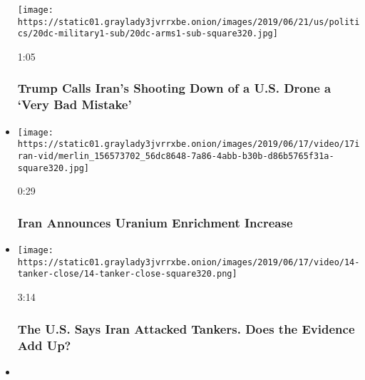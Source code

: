 \begin{itemize}
  \texttt{[image: https://static01.graylady3jvrrxbe.onion/images/2019/06/21/us/politics/20dc-military1-sub/20dc-arms1-sub-square320.jpg]}

  1:05

  \hypertarget{trump-calls-irans-shooting-down-of-a-us-drone-a-very-bad-mistake}{%
  \subsubsection{Trump Calls Iran's Shooting Down of a U.S. Drone a
  `Very Bad
  Mistake'}\label{trump-calls-irans-shooting-down-of-a-us-drone-a-very-bad-mistake}}
\item
  \href{https://www.nytimes3xbfgragh.onion/video/world/middleeast/100000006562480/iran-uranium.html?action=click\&module=video-series-bar\&region=header\&pgtype=Article\&playlistId=video/us-iran-relations}{}

  \texttt{[image: https://static01.graylady3jvrrxbe.onion/images/2019/06/17/video/17iran-vid/merlin\_156573702\_56dc8648-7a86-4abb-b30b-d86b5765f31a-square320.jpg]}

  0:29

  \hypertarget{iran-announces-uranium-enrichment-increase}{%
  \subsubsection{Iran Announces Uranium Enrichment
  Increase}\label{iran-announces-uranium-enrichment-increase}}
\item
  \href{https://www.nytimes3xbfgragh.onion/video/world/middleeast/100000006558872/iran-tanker-video.html?action=click\&module=video-series-bar\&region=header\&pgtype=Article\&playlistId=video/us-iran-relations}{}

  \texttt{[image: https://static01.graylady3jvrrxbe.onion/images/2019/06/17/video/14-tanker-close/14-tanker-close-square320.png]}

  3:14

  \hypertarget{the-us-says-iran-attacked-tankers-does-the-evidence-add-up}{%
  \subsubsection{The U.S. Says Iran Attacked Tankers. Does the Evidence
  Add
  Up?}\label{the-us-says-iran-attacked-tankers-does-the-evidence-add-up}}
\item
  \href{https://www.nytimes3xbfgragh.onion/video/world/middleeast/100000006552757/nizar-zakka-iran.html?action=click\&module=video-series-bar\&region=header\&pgtype=Article\&playlistId=video/us-iran-relations}{}


\end{itemize}
